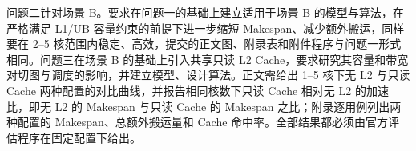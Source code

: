 问题二针对场景 B。要求在问题一的基础上建立适用于场景 B 的模型与算法，在严格满足 L1/UB 容量约束的前提下进一步缩短 Makespan、减少额外搬运，同样要在 2--5 核范围内稳定、高效，提交的正文图、附录表和附件程序与问题一形式相同。问题三在场景 B 的基础上引入共享只读 L2 Cache，要求研究其容量和带宽对切图与调度的影响，并建立模型、设计算法。正文需给出 1--5 核下无 L2 与只读 Cache 两种配置的对比曲线，并报告相同核数下只读 Cache 相对无 L2 的加速比，即无 L2 的 Makespan 与只读 Cache 的 Makespan 之比；附录逐用例列出两种配置的 Makespan、总额外搬运量和 Cache 命中率。全部结果都必须由官方评估程序在固定配置下给出。
